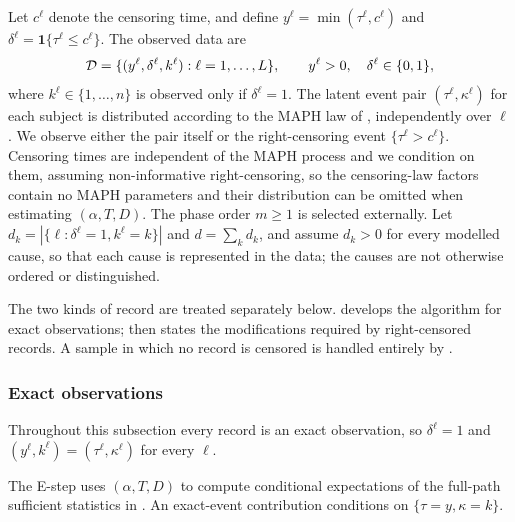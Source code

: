 \documentclass{article}
\newenvironment{rcrevision}{}{}
\newenvironment{aarevision}{}{}
\newcommand{\aachg}[1]{#1}
\newcommand{\subchg}[1]{#1}
\begin{document}
\begin{rcrevision}
Let \aachg{$c^\ell$} denote the censoring time, and define \aachg{$y^\ell=\min(\tau^\ell,c^\ell)$} and \aachg{$\delta^\ell=\mathbf 1\{\tau^\ell\le c^\ell\}$}. The observed data are
\end{rcrevision}
\[
{\cal D}=\{(y^\ell,\delta^\ell,k^\ell):\ell=1,\ldots,L\},
\qquad y^\ell>0,\quad \delta^\ell\in\{0,1\},
\]
\begin{rcrevision}
where $k^\ell\in\{1,\ldots,n\}$ is observed only if $\delta^\ell=1$. The latent event pair $(\tau^\ell,\kappa^\ell)$ for each subject is distributed according to the MAPH law of \aachg{}, independently over $\ell$. We observe either the pair itself or the right-censoring event $\{\tau^\ell>c^\ell\}$. \aachg{Censoring times are independent of the MAPH process and we condition on them, assuming non-informative right-censoring, so the censoring-law factors contain no MAPH parameters and their distribution can be omitted when estimating $(\alpha,T,D)$.} The phase order $m\ge1$ is selected externally. Let $d_k=|\{\ell:\delta^\ell=1,k^\ell=k\}|$ and $d=\sum_k d_k$, and \subchg{assume $d_k>0$ for every modelled cause, so that each cause is represented in the data; the causes are not otherwise ordered or distinguished}.
\end{rcrevision}

\begin{aarevision}
The two kinds of record are treated separately below.  develops the algorithm for exact observations;  then states the modifications required by right-censored records. A sample in which no record is censored is handled entirely by .
\end{aarevision}

\subsubsection{Exact observations}
\label{sec:em-exact}

\begin{aarevision}
Throughout this subsection every record is an exact observation, so $\delta^\ell=1$ and $(y^\ell,k^\ell)=(\tau^\ell,\kappa^\ell)$ for every $\ell$.
\end{aarevision}

\begin{rcrevision}
The E-step uses $(\alpha,T,D)$ to compute conditional expectations of the full-path sufficient statistics in . \aachg{An exact-event contribution conditions on $\{\tau=y,\kappa=k\}$.}
\end{rcrevision}
\end{document}
